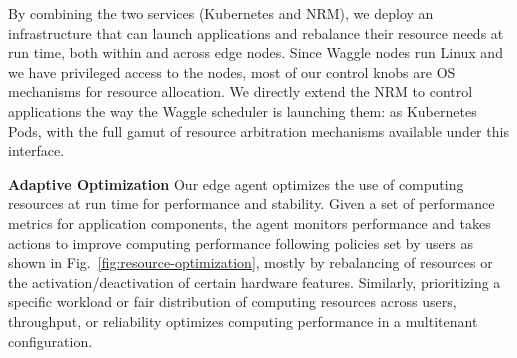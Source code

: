 By combining the two services (Kubernetes and NRM), we deploy an infrastructure that can launch applications and rebalance their resource needs at run time, both within and across edge nodes. Since Waggle nodes run Linux and we have privileged access to the nodes, most of our control knobs are OS mechanisms for resource allocation. We directly extend the NRM to control applications the way the Waggle scheduler is launching them: as Kubernetes Pods, with the full gamut of resource arbitration mechanisms available under this interface. 




\textbf{Adaptive Optimization} Our edge agent optimizes the use of computing resources at run time for performance and stability. Given a set of performance metrics for application components, the agent monitors performance and takes actions to improve computing performance following policies set by users as shown in Fig.~\ref{fig:resource-optimization}, mostly by rebalancing of resources or the activation/deactivation of certain hardware features. Similarly, prioritizing a specific workload or fair distribution of computing resources across users, throughput, or reliability optimizes computing performance in a multitenant configuration.

